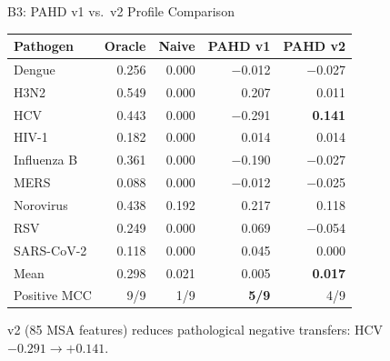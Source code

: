 \documentclass[aspectratio=169,11pt]{beamer}
\begin{document}
\begin{frame}{B3: PAHD v1 vs.\ v2 Profile Comparison}

\small
\begin{center}
\begin{tabular}{lrrrr}
\toprule
\textbf{Pathogen} & \textbf{Oracle} & \textbf{Naive} & \textbf{PAHD v1} & \textbf{PAHD v2} \\
\midrule
Dengue      & 0.256 & 0.000 & $-$0.012 & $-$0.027 \\
H3N2        & 0.549 & 0.000 & 0.207 & 0.011 \\
HCV         & 0.443 & 0.000 & $-$0.291 & \textcolor{pahdgreen}{\textbf{0.141}} \\
HIV-1       & 0.182 & 0.000 & 0.014 & 0.014 \\
Influenza B & 0.361 & 0.000 & $-$0.190 & $-$0.027 \\
MERS        & 0.088 & 0.000 & $-$0.012 & $-$0.025 \\
Norovirus   & 0.438 & 0.192 & 0.217 & 0.118 \\
RSV         & 0.249 & 0.000 & 0.069 & $-$0.054 \\
SARS-CoV-2  & 0.118 & 0.000 & 0.045 & 0.000 \\
\midrule
Mean & 0.298 & 0.021 & 0.005 & \textbf{0.017} \\
Positive MCC & 9/9 & 1/9 & \textbf{5/9} & 4/9 \\
\bottomrule
\end{tabular}
\end{center}

\vspace{0.3em}
v2 (85 MSA features) reduces pathological negative transfers: HCV $-0.291 \to +0.141$.
\end{frame}
\end{document}
